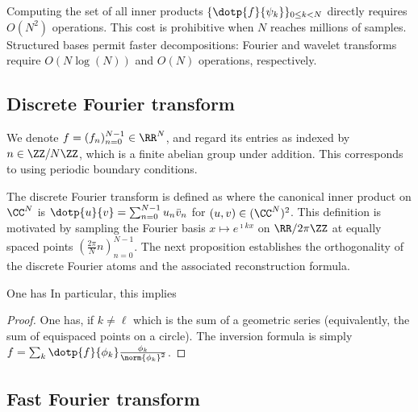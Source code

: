 Computing the set of all inner products $\{\dotp{f}{\psi_k}\}_{0 \leq k < N}$ directly requires $O(N^2)$ operations.
This cost is prohibitive when $N$ reaches millions of samples. Structured bases permit faster decompositions: Fourier and wavelet transforms require $O(N\log(N))$ and $O(N)$ operations, respectively.


\subsection{Discrete Fourier transform}

We denote $f = (f_n)_{n=0}^{N-1} \in \RR^N$, and regard its entries as indexed by $n \in \ZZ/N\ZZ$, which is a finite abelian group under addition. This corresponds to using periodic boundary conditions.

The discrete Fourier transform is defined as
where the canonical inner product on $\CC^N$ is $\dotp{u}{v}=\sum_{n=0}^{N-1}u_n\bar v_n$ for $(u,v) \in (\CC^N)^2$.
%
This definition is motivated by sampling the Fourier basis $x \mapsto e^{\imath k x}$ on $\RR/2\pi\ZZ$ at equally spaced points $( \frac{2\pi}{N}n )_{n=0}^{N-1}$.
%
The next proposition establishes the orthogonality of the discrete Fourier atoms and the associated reconstruction formula.

\begin{prop}
	One has
	In particular, this implies
\end{prop}
\begin{proof}
	One has, if $k \neq \ell$
	which is the sum of a geometric series (equivalently, the sum of equispaced points on a circle). 
	The inversion formula is simply $f = \sum_k \dotp{f}{\phi_k} \frac{\phi_k}{\norm{\phi_k}^2}$.
\end{proof}


\subsection{Fast Fourier transform}

